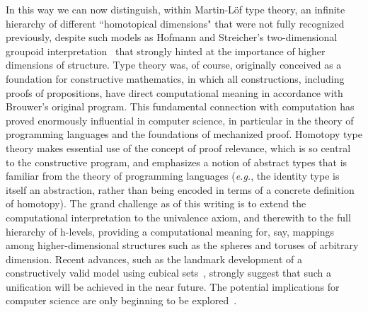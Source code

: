 \documentclass[11pt]{article}
\theoremstyle{remark}
\theoremstyle{definition}
\begin{document}
In this way we can now distinguish, within Martin-L\"{o}f type theory, an infinite hierarchy of different ``homotopical
dimensions" that were not fully recognized previously, despite such models as Hofmann and Streicher's two-dimensional
groupoid interpretation~\cite{HS} that strongly hinted at the importance of higher dimensions of structure.  Type theory
was, of course, originally conceived as a foundation for constructive mathematics, in which all constructions, including
proofs of propositions, have direct computational meaning in accordance with Brouwer's original program.  This
fundamental connection with computation has proved enormously influential in computer science, in particular in the
theory of programming languages and the foundations of mechanized proof.  Homotopy type theory makes essential use of the
concept of proof relevance, which is so central to the constructive program, and emphasizes a notion of abstract types that is
familiar from the theory of programming languages (\textit{e.g.}, the identity type is itself an abstraction, rather than being encoded in terms of a concrete definition of homotopy).  The grand challenge as of this writing is to
extend the computational interpretation to the univalence axiom, and therewith to the full hierarchy of h-levels, providing a computational meaning for, say, mappings among higher-dimensional structures such as the spheres and toruses of arbitrary dimension.  Recent advances,
such as the landmark development of a constructively valid model using cubical sets~\cite{BCH}, strongly suggest that
such a unification will be achieved in the near future.  The potential implications for computer science are only
beginning to be explored~\cite{AMLH}.
\end{document}
